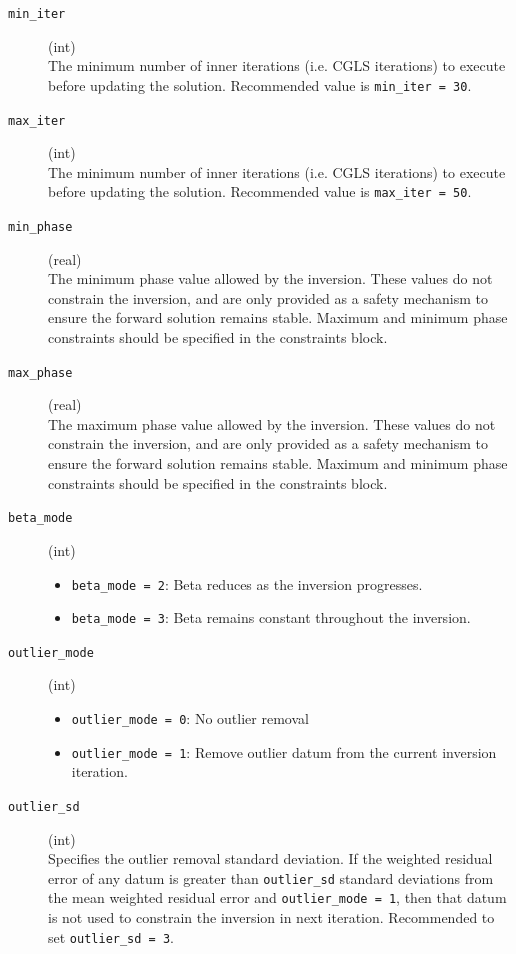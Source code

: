 \documentclass[a4paper,12pt]{article}
\begin{document}
\begin{description}
     \item[\texttt{min\_iter}] (int)\hfill \\
     The minimum number of inner iterations (i.e. CGLS iterations) to execute before updating the solution. Recommended value is \texttt{min\_iter = 30}.

     \item[\texttt{max\_iter}] (int)\hfill \\
     The minimum number of inner iterations (i.e. CGLS iterations) to execute before updating the solution. Recommended value is \texttt{max\_iter = 50}.

     \item[\texttt{min\_phase}] (real)\hfill \\
     The minimum phase value allowed by the inversion. These values do not constrain the inversion, and are only provided as a safety mechanism to ensure the forward solution remains stable. Maximum and minimum phase constraints should be specified in the constraints block.

     \item[\texttt{max\_phase}] (real)\hfill \\
     The maximum phase value allowed by the inversion. These values do not constrain the inversion, and are only provided as a safety mechanism to ensure the forward solution remains stable. Maximum and minimum phase constraints should be specified in the constraints block.

     \item[\texttt{beta\_mode}] (int)\hfill \\
    \begin{itemize}
        \item \texttt{beta\_mode = 2}: Beta reduces as the inversion progresses.
        \item \texttt{beta\_mode = 3}: Beta remains constant throughout the inversion.
    \end{itemize}

    \item[\texttt{outlier\_mode}] (int)\hfill \\
    \begin{itemize}
        \item \texttt{outlier\_mode = 0}: No outlier removal
        \item \texttt{outlier\_mode = 1}: Remove outlier datum from the current inversion iteration.
    \end{itemize}

    \item[\texttt{outlier\_sd}] (int)\hfill \\
    Specifies the outlier removal standard deviation. If the weighted residual error of any datum is greater than \texttt{outlier\_sd} standard deviations from the mean weighted residual error and \texttt{outlier\_mode = 1}, then that datum is not used to constrain the inversion in next iteration. Recommended to set \texttt{outlier\_sd = 3}.

\end{description}
\end{document}
